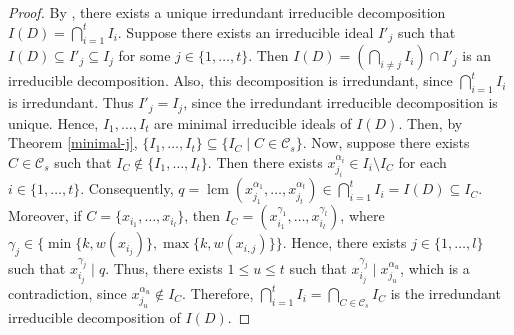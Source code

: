 \documentclass[11pt,reqno]{amsart}
\theoremstyle{definition}
\begin{document}
\begin{proof}

By \cite[Theorem 1.3.1]{hh11}, there exists a unique irredundant irreducible decomposition $I(D)=\bigcap_{i=1}^{t} I_i$. Suppose there exists an irreducible ideal $I'_j$ such that
$I(D)\subseteq I'_j \subseteq I_j$ for some $j\in \{1,\ldots,t\}$. Then $I(D)=\left(\bigcap_{i\ne j} I_i\right)\cap I'_j$ is an irreducible decomposition. Also, this decomposition is irredundant, since
\(\bigcap_{i=1}^{t} I_i\) is irredundant. Thus $I'_j = I_j$, since the irredundant irreducible decomposition is unique. Hence, $I_1,\ldots,I_t$ are minimal irreducible ideals of $I(D)$. Then, by Theorem \ref{minimal-j}, $\{I_1,\ldots,I_t\} \subseteq \{I_C \mid C\in \mathcal{C}_s\}$. Now, suppose there exists $C\in \mathcal{C}_s$ such that
$I_C \notin \{I_1,\ldots,I_t\}$. Then there exists $x^{\alpha_{i}}_{j_i}\in I_i \setminus I_C$ for each $i\in \{1,\ldots,t\}$.
Consequently, $q=\operatorname{lcm}(x^{\alpha_1}_{j_1},\ldots,x^{\alpha_{t}}_{j_t})
\in \bigcap_{i=1}^{t} I_i = I(D) \subseteq I_C.$ Moreover, if $C=\{x_{i_1},\ldots,x_{i_l}\}$, then
$I_C=(x_{i_1}^{\gamma_1},\ldots,x_{i_l}^{\gamma_l})$,
where $\gamma_j \in \{\min\{k,w(x_{i_j})\}, \max\{k,w(x_{i,j})\}\}$. Hence, there exists $j\in \{1,\ldots,l\}$ such that $x_{i_j}^{\gamma_j} \mid q$.
Thus, there exists $1\le u\le t$ such that
$x_{i_j}^{\gamma_j} \mid x_{j_u}^{\alpha_u}$,
which is a contradiction, since $x_{j_u}^{\alpha_u} \notin I_C$. Therefore,
$\bigcap_{i=1}^{t} I_i = \bigcap_{C\in \mathcal{C}_s} I_C$
is the irredundant irreducible decomposition of $I(D)$.
\end{proof}
\end{document}
